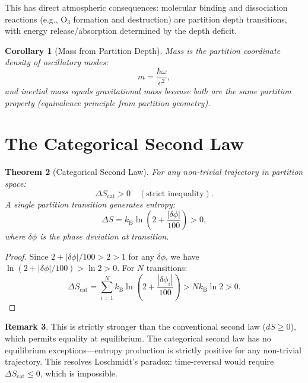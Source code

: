 \documentclass[twocolumn,10pt]{article}
\newtheorem{theorem}{Theorem}[section]
\newtheorem{corollary}[theorem]{Corollary}
\theoremstyle{definition}
\newtheorem{remark}[theorem]{Remark}
\newcommand{\kB}{k_{\mathrm{B}}}
\begin{document}
This has direct atmospheric consequences: molecular binding and dissociation reactions (e.g., O$_3$ formation and destruction) are partition depth transitions, with energy release/absorption determined by the depth deficit.

\begin{corollary}[Mass from Partition Depth]\label{cor:mass}
Mass is the partition coordinate density of oscillatory modes:
\begin{equation}\label{eq:mass_partition}
    m = \frac{\hbar\omega}{c^2},
\end{equation}
and inertial mass equals gravitational mass because both are the same partition property (equivalence principle from partition geometry).
\end{corollary}

\section{The Categorical Second Law}\label{sec:second_law}

\begin{theorem}[Categorical Second Law]\label{thm:second_law}
For any non-trivial trajectory in partition space:
\begin{equation}\label{eq:cat_second_law}
    \Delta S_{\mathrm{cat}} > 0 \quad (\text{strict inequality}).
\end{equation}
A single partition transition generates entropy:
\begin{equation}\label{eq:entropy_per_transition}
    \Delta S = \kB\ln\left(2 + \frac{|\delta\phi|}{100}\right) > 0,
\end{equation}
where $\delta\phi$ is the phase deviation at transition.
\end{theorem}

\begin{proof}
Since $2 + |\delta\phi|/100 > 2 > 1$ for any $\delta\phi$, we have $\ln(2 + |\delta\phi|/100) > \ln 2 > 0$. For $N$ transitions:
\begin{equation}
    \Delta S_{\mathrm{cat}} = \sum_{i=1}^{N}\kB\ln\left(2 + \frac{|\delta\phi_i|}{100}\right) > N\kB\ln 2 > 0.
\end{equation}
\end{proof}

\begin{remark}
This is strictly stronger than the conventional second law ($dS \geq 0$), which permits equality at equilibrium. The categorical second law has no equilibrium exceptions---entropy production is strictly positive for any non-trivial trajectory. This resolves Loschmidt's paradox: time-reversal would require $\Delta S_{\mathrm{cat}} \leq 0$, which is impossible.
\end{remark}
\end{document}

